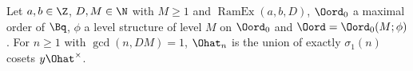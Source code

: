 Let $a,b\in\Z$, $D,M\in\N$ with $M\ge1$ and $\operatorname{RamEx}(a,b,D)$, $\Oord_0$ a maximal order of $\Bq$, $\phi$ a level structure of
level $M$ on $\Oord_0$ and $\Oord=\Oord_0(M;\phi)$. For $n\ge1$ with $\gcd(n,DM)=1$, $\Ohat_n$ is the union of exactly $\sigma_1(n)$ cosets
$y\Ohat^\times$.
